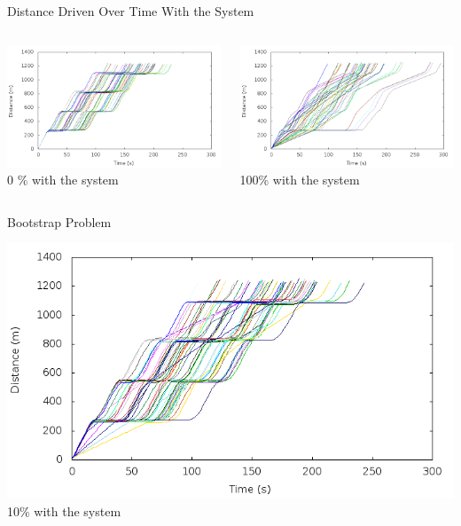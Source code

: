 	
\begin{frame}{Distance Driven Over Time With the System}
\begin{columns}
	\begin{column}{0.4\textwidth}
	\includegraphics[width=1\textwidth]{images/tp0/distance0.png}\\
	0 \% with the system
	\end{column}
	\begin{column}{0.6\textwidth}
	\includegraphics[width=1\textwidth]{images/tp0/distance100.png}\\
	100\% with the system
	\end{column}
\end{columns}
\end{frame}


\begin{frame}{Bootstrap Problem}

\includegraphics[width=1\textwidth]{images/tp0/distance10.png}\\
10\% with the system
\end{frame}

